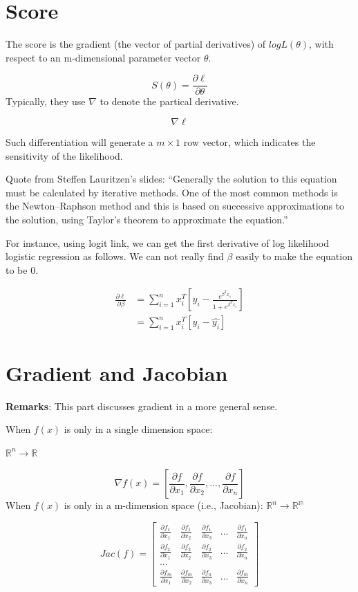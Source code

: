 \documentclass[]{book}
\begin{document}
\hypertarget{score}{%
\section{Score}\label{score}}

The score is the gradient (the vector of partial derivatives) of \(log L(\theta)\), with respect to an m-dimensional parameter vector \(\theta\).

\[S(\theta) = \frac{\partial\ell}{\partial \theta}\]
Typically, they use \(\nabla\) to denote the partical derivative.

\[\nabla \ell\]

Such differentiation will generate a \(m \times 1\) row vector, which indicates the sensitivity of the likelihood.

Quote from Steffen Lauritzen's slides: ``Generally the solution to this equation must be calculated by iterative methods. One of the most common methods is the Newton--Raphson
method and this is based on successive approximations to the solution, using Taylor's theorem to approximate the equation.''

For instance, using logit link, we can get the first derivative of log likelihood logistic regression as follows. We can not really find \(\beta\) easily to make the equation to be 0.

\[\begin{aligned}
\frac{\partial \ell} {\partial \beta} 
&= \sum_{i=1}^{n}x_i^T[y_i-\frac{e^{\beta^Tx_i}}{1+e^{\beta^Tx_i}}] \\
&=\sum_{i=1}^{n} x_i^T[y_i-\hat{y_i}]
\end{aligned}\]

\hypertarget{gradient-and-jacobian}{%
\section{Gradient and Jacobian}\label{gradient-and-jacobian}}

\textbf{Remarks}: This part discusses gradient in a more general sense.

When \(f(x)\) is only in a single dimension space:

\(\mathbb{R}^n \rightarrow \mathbb{R}\)

\[\nabla f(x)=[\frac{\partial f}{\partial x_1},\frac{\partial f}{\partial x_2},...,\frac{\partial f}{\partial x_n}]\]
When \(f(x)\) is only in a m-dimension space (i.e., Jacobian):
\(\mathbb{R}^n \rightarrow \mathbb{R^m}\)

\[Jac(f)=\begin{bmatrix}
\frac{\partial f_1}{\partial x_1} & \frac{\partial f_1}{\partial x_2} & \frac{\partial f_1}{\partial x_3} & ... & \frac{\partial f_1}{\partial x_n}\\
\frac{\partial f_2}{\partial x_1} & \frac{\partial f_2}{\partial x_2} & \frac{\partial f_2}{\partial x_3} & ... & \frac{\partial f_2}{\partial x_n} \\
...\\
\frac{\partial f_m}{\partial x_1} & \frac{\partial f_m}{\partial x_2} & \frac{\partial f_n}{\partial x_3} & ... & \frac{\partial f_m}{\partial x_n}
\end{bmatrix}\]
\end{document}
